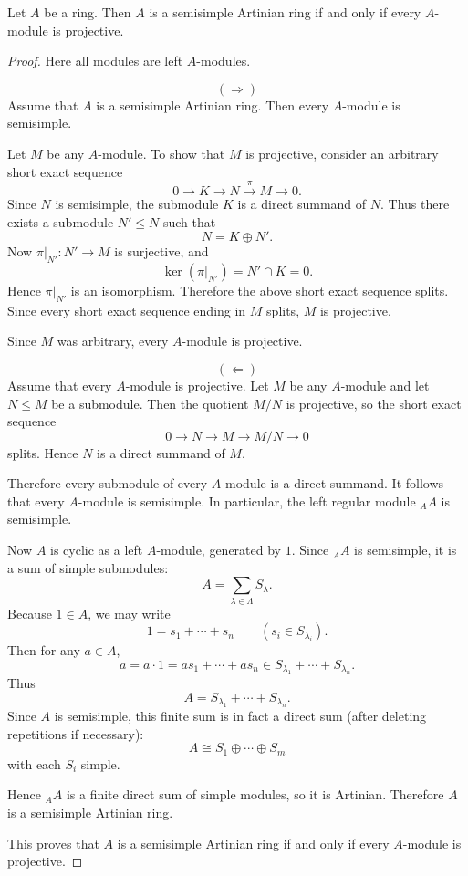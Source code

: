 \begin{exercise}
    Let $A$ be a ring. Then $A$ is a semisimple Artinian ring if and only if every $A$-module is projective.
\end{exercise}

\begin{proof}
    Here all modules are left $A$-modules.

    \[
        (\Rightarrow)
    \]
    Assume that $A$ is a semisimple Artinian ring. Then every $A$-module is semisimple.

    Let $M$ be any $A$-module. To show that $M$ is projective, consider an arbitrary short exact sequence
    \[
        0\longrightarrow K \longrightarrow N \xrightarrow{\pi} M \longrightarrow 0.
    \]
    Since $N$ is semisimple, the submodule $K$ is a direct summand of $N$. Thus there exists a submodule $N'\leq N$ such that
    \[
        N=K\oplus N'.
    \]
    Now $\pi|_{N'}:N'\to M$ is surjective, and
    \[
        \ker(\pi|_{N'})=N'\cap K=0.
    \]
    Hence $\pi|_{N'}$ is an isomorphism. Therefore the above short exact sequence splits. Since every short exact sequence ending in $M$ splits, $M$ is projective.

    Since $M$ was arbitrary, every $A$-module is projective.

    \[
        (\Leftarrow)
    \]
    Assume that every $A$-module is projective. Let $M$ be any $A$-module and let $N\leq M$ be a submodule. Then the quotient $M/N$ is projective, so the short exact sequence
    \[
        0\longrightarrow N \longrightarrow M \longrightarrow M/N \longrightarrow 0
    \]
    splits. Hence $N$ is a direct summand of $M$.

    Therefore every submodule of every $A$-module is a direct summand. It follows that every $A$-module is semisimple. In particular, the left regular module ${}_AA$ is semisimple.

    Now $A$ is cyclic as a left $A$-module, generated by $1$. Since ${}_AA$ is semisimple, it is a sum of simple submodules:
    \[
        A=\sum_{\lambda\in \Lambda} S_\lambda.
    \]
    Because $1\in A$, we may write
    \[
        1=s_1+\cdots+s_n
        \qquad (s_i\in S_{\lambda_i}).
    \]
    Then for any $a\in A$,
    \[
        a=a\cdot 1=a s_1+\cdots+a s_n \in S_{\lambda_1}+\cdots+S_{\lambda_n}.
    \]
    Thus
    \[
        A=S_{\lambda_1}+\cdots+S_{\lambda_n}.
    \]
    Since $A$ is semisimple, this finite sum is in fact a direct sum (after deleting repetitions if necessary):
    \[
        A\cong S_1\oplus\cdots\oplus S_m
    \]
    with each $S_i$ simple.

    Hence ${}_AA$ is a finite direct sum of simple modules, so it is Artinian. Therefore $A$ is a semisimple Artinian ring.

    This proves that $A$ is a semisimple Artinian ring if and only if every $A$-module is projective.
\end{proof}

